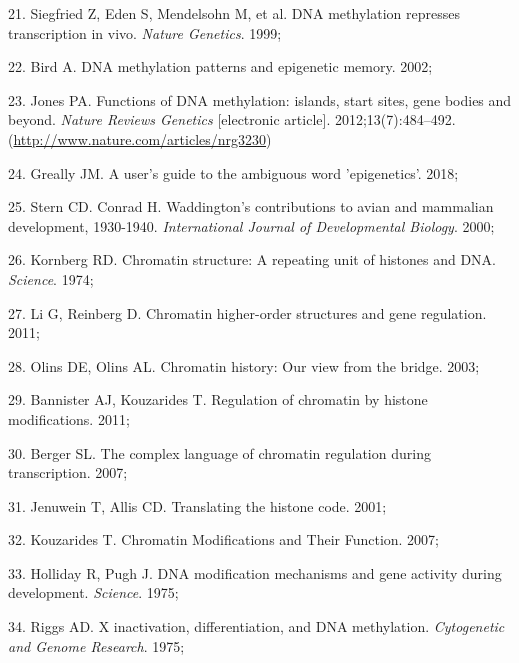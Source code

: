 \documentclass[11pt,oneside]{bristolthesis}
\newenvironment{cslreferences}%
  {}%
  {\par}
\begin{document}
\begin{cslreferences}
\leavevmode\hypertarget{ref-Siegfried1999}{}%
21. Siegfried Z, Eden S, Mendelsohn M, et al. DNA methylation represses transcription in vivo. \emph{Nature Genetics}. 1999;

\leavevmode\hypertarget{ref-Bird2002}{}%
22. Bird A. DNA methylation patterns and epigenetic memory. 2002;

\leavevmode\hypertarget{ref-Jones2012}{}%
23. Jones PA. Functions of DNA methylation: islands, start sites, gene bodies and beyond. \emph{Nature Reviews Genetics} {[}electronic article{]}. 2012;13(7):484--492. (\url{http://www.nature.com/articles/nrg3230})

\leavevmode\hypertarget{ref-Greally2018}{}%
24. Greally JM. A user's guide to the ambiguous word 'epigenetics'. 2018;

\leavevmode\hypertarget{ref-Stern2000}{}%
25. Stern CD. Conrad H. Waddington's contributions to avian and mammalian development, 1930-1940. \emph{International Journal of Developmental Biology}. 2000;

\leavevmode\hypertarget{ref-Kornberg1974}{}%
26. Kornberg RD. Chromatin structure: A repeating unit of histones and DNA. \emph{Science}. 1974;

\leavevmode\hypertarget{ref-Li2011}{}%
27. Li G, Reinberg D. Chromatin higher-order structures and gene regulation. 2011;

\leavevmode\hypertarget{ref-Olins2003}{}%
28. Olins DE, Olins AL. Chromatin history: Our view from the bridge. 2003;

\leavevmode\hypertarget{ref-Bannister2011}{}%
29. Bannister AJ, Kouzarides T. Regulation of chromatin by histone modifications. 2011;

\leavevmode\hypertarget{ref-Berger2007}{}%
30. Berger SL. The complex language of chromatin regulation during transcription. 2007;

\leavevmode\hypertarget{ref-Jenuwein2001}{}%
31. Jenuwein T, Allis CD. Translating the histone code. 2001;

\leavevmode\hypertarget{ref-Kouzarides2007}{}%
32. Kouzarides T. Chromatin Modifications and Their Function. 2007;

\leavevmode\hypertarget{ref-Holliday1975}{}%
33. Holliday R, Pugh J. DNA modification mechanisms and gene activity during development. \emph{Science}. 1975;

\leavevmode\hypertarget{ref-Riggs1975}{}%
34. Riggs AD. X inactivation, differentiation, and DNA methylation. \emph{Cytogenetic and Genome Research}. 1975;


\end{cslreferences}
\end{document}
